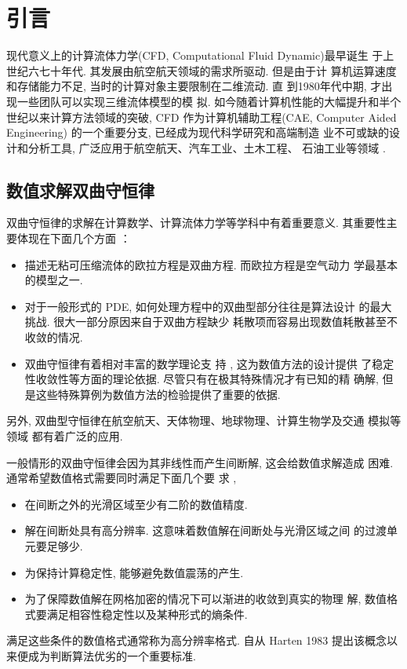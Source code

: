 
\chapter{引言}
\label{chap:introduction}

现代意义上的计算流体力学(CFD, Computational Fluid Dynamic)最早诞生
于上世纪六七十年代.  其发展由航空航天领域的需求所驱动.  但是由于计
算机运算速度和存储能力不足, 当时的计算对象主要限制在二维流动.  直
到1980年代中期, 才出现一些团队可以实现三维流体模型的模
拟\cite{Venkatakrishnan1996}.  如今随着计算机性能的大幅提升和半个
世纪以来计算方法领域的突破, CFD 作为计算机辅助工程(CAE, Computer
Aided Engineering) 的一个重要分支, 已经成为现代科学研究和高端制造
业不可或缺的设计和分析工具, 广泛应用于航空航天、汽车工业、土木工程、
石油工业等领域 \cite{anderson1995book, blazek2006}.

\section{数值求解双曲守恒律}
\label{sec:hyperbolic-conservation-law}

双曲守恒律的求解在计算数学、计算流体力学等学科中有着重要意义.
其重要性主要体现在下面几个方面 \cite{Toro2009} ：
\begin{itemize}
\item 描述无粘可压缩流体的欧拉方程是双曲方程. 而欧拉方程是空气动力
  学最基本的模型之一.
\item 对于一般形式的 PDE, 如何处理方程中的双曲型部分往往是算法设计
  的最大挑战\cite{LeVeque1992a}. 很大一部分原因来自于双曲方程缺少
  耗散项而容易出现数值耗散甚至不收敛的情况.
\item 双曲守恒律有着相对丰富的数学理论支
  持 \cite{DiPerna1979,Lax1973,Glimm1965}, 这为数值方法的设计提供
  了稳定性收敛性等方面的理论依据. 尽管只有在极其特殊情况才有已知的精
  确解, 但是这些特殊算例为数值方法的检验提供了重要的依据.
\end{itemize}
另外, 双曲型守恒律在航空航天、天体物理、地球物理、计算生物学及交通
模拟等领域 \cite{Dumbser2016,Colombo2002} 都有着广泛的应用.

一般情形的双曲守恒律会因为其非线性而产生间断解, 这会给数值求解造成
困难. 通常希望数值格式需要同时满足下面几个要
求 \cite{LeVeque1992a,Harten1983},
\begin{itemize}
\item 在间断之外的光滑区域至少有二阶的数值精度.
\item 解在间断处具有高分辨率. 这意味着数值解在间断处与光滑区域之间
  的过渡单元要足够少.
\item 为保持计算稳定性, 能够避免数值震荡的产生.
\item 为了保障数值解在网格加密的情况下可以渐进的收敛到真实的物理
  解, 数值格式要满足相容性稳定性以及某种形式的熵条件.
\end{itemize}
满足这些条件的数值格式通常称为高分辨率格式. 自从 Harten 1983
\cite{Harten1983} 提出该概念以来便成为判断算法优劣的一个重要标准.

